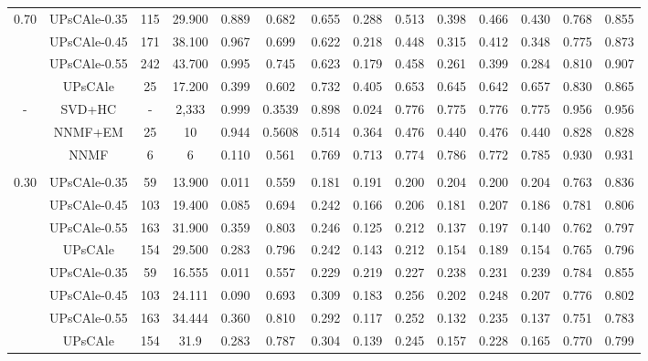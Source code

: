 \begin{table*}
\begin{scriptsize}
\begin{tabular}{|c||c|c|c|c||c|c|c|c|c|c|c|c|c|}
\\ \hline	


\multirow{4}{*}{0.70} 
 & UPsCAle-0.35 & 115& 29.900 & 0.889 & 0.682 & 0.655 & 0.288 & 0.513 & 0.398 & 0.466 & 0.430 & 0.768 & 0.855
\\ 
 & UPsCAle-0.45 & 171& 38.100 & 0.967 & 0.699 & 0.622 & 0.218 & 0.448 & 0.315 & 0.412 & 0.348 & 0.775 & 0.873
\\ 
 & UPsCAle-0.55 & 242& 43.700 & 0.995 & 0.745 & 0.623 & 0.179 & 0.458 & 0.261 & 0.399 & 0.284 & 0.810 & 0.907 
\\
& UPsCAle  & 25 & 17.200 & 0.399 & 0.602 & 0.732 & 0.405 & 0.653 & 0.645 & 0.642 & 0.657 & 0.830 & 0.865
\\ \hline 


\multirow{4}{*}{-} 
 & SVD+HC & - &2,333 & 0.999 & 0.3539 & 0.898 & 0.024 & 0.776 & 0.775 & 0.776 & 0.775 & 0.956 & 0.956
\\ 
 & NNMF+EM & 25 &10 &0.944 & 0.5608 & 0.514 & 0.364 & 0.476 & 0.440 & 0.476 & 0.440 & 0.828 & 0.828
\\ 
 & NNMF & 6 &6 &0.110 & 0.561 & 0.769 & 0.713 & 0.774 & 0.786 & 0.772 & 0.785 & 0.930 & 0.931
\\ \hline	


\hline

\multicolumn{14}{|c|}{\textbf{AgNews}} 
\\ \hline \hline
 
 \multirow{3}{*}{0.30} 
  & UPsCAle-0.35 & 59&  13.900 & 0.011 & 0.559 & 0.181 & 0.191 & 0.200 & 0.204 & 0.200 & 0.204 & 0.763 & 0.836
\\ 
 & UPsCAle-0.45 & 103& 19.400 & 0.085 & 0.694 & 0.242 & 0.166 & 0.206 & 0.181 & 0.207 & 0.186 & 0.781 & 0.806
\\ 
 & UPsCAle-0.55 & 163& 31.900 & 0.359 & 0.803 & 0.246 & 0.125 & 0.212 & 0.137 & 0.197 & 0.140 & 0.762 & 0.797
\\
& UPsCAle        & 154 & 29.500 & 0.283 & 0.796 & 0.242 & 0.143 & 0.212 & 0.154 & 0.189 & 0.154 & 0.765 & 0.796 
\\ \hline{}


\multirow{3}{*}{0.50} 
 & UPsCAle-0.35 & 59& 16.555   & 0.011 &  0.557 &                  0.229 & 0.219  & 0.227 & 0.238  & 0.231 & 0.239  & 0.784 & 0.855
\\
 & UPsCAle-0.45 & 103 &  24.111  & 0.090 & 0.693 &              0.309 & 0.183  & 0.256 & 0.202  & 0.248 & 0.207  & 0.776 & 0.802
\\ 
 & UPsCAle-0.55 & 163&   34.444   & 0.360 & 0.810 &           0.292 & 0.117  & 0.252 & 0.132  & 0.235 & 0.137  & 0.751 & 0.783 
 \\
 & UPsCAle & 154 &   31.9   & 0.283 & 0.787 & 0.304 & 0.139  & 0.245 & 0.157 & 0.228 & 0.165  & 0.770 & 0.799 
\\ \hline


\end{tabular}
\end{scriptsize}
\end{table*}

